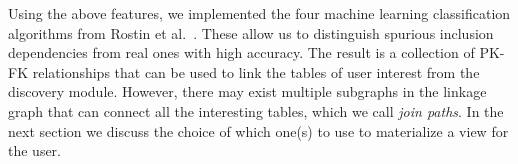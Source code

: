 Using the above features, we implemented the four machine learning classification algorithms from Rostin et al.~\cite{DBLP:conf/webdb/RostinABNL09}. These allow us to distinguish spurious inclusion dependencies from real ones  with high accuracy.
The result is a collection of PK-FK relationships that can be used to link the tables of user interest from the discovery module. However, there may exist multiple subgraphs in the linkage graph that can connect all the interesting tables, which we call \emph{join paths}. In the next section we discuss the choice of which one(s) to use to materialize a view for the user.


